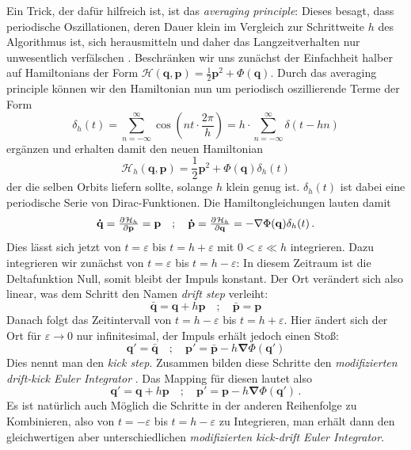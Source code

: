 \documentclass[12pt,a4paper,twoside,open=right,bibliography=totoc]{scrbook}
\renewcommand{\cite}{ \citep}
\renewcommand{\vec}{\mathbf}
\renewcommand{\H}{\mathcal H}
\begin{document}
Ein Trick, der dafür hilfreich ist, ist das \textit{averaging principle}: Dieses besagt, dass periodische Oszillationen, deren Dauer klein im Vergleich zur Schrittweite $h$ des Algorithmus ist, sich herausmitteln und daher das Langzeitverhalten nur unwesentlich verfälschen\cite{Wisdom1991}.
Beschränken wir uns zunächst der Einfachheit halber auf Hamiltonians der Form $\mathcal H(\vec q,\vec p)= \frac{1}{2}\vec p^2+\Phi(\vec q)$.
Durch das averaging principle können wir den Hamiltonian nun um periodisch oszillierende Terme der Form
\begin{equation}
\delta_h(t) = \sum\limits_{n=-\infty}^{\infty} \cos(nt\cdot \frac{2\pi}{h}) = h \cdot \sum\limits_{n=-\infty}^{\infty} \delta(t-h n)
\end{equation}
ergänzen und erhalten damit den neuen Hamiltonian
\begin{equation}
\mathcal H_h(\vec q,\vec p)= \frac{1}{2}\vec p^2+\Phi(\vec q)\delta_h(t)
\end{equation}
der die selben Orbits liefern sollte, solange $h$ klein genug ist. $\delta_h(t)$ ist dabei eine periodische Serie von Dirac-Funktionen. Die Hamiltongleichungen lauten damit
\begin{equation}
\vec{\dot q} = \pd{\H_h}{\vec{p}} = \vec{p} \quad ; \quad 
\vec{\dot p} = \pd{\H_h}{\vec{q}} = - \vec{\nabla}\Phi(\vec q)\delta_h(t) \, .
\end{equation}
Dies lässt sich jetzt von $t=\varepsilon$ bis $t=h+\varepsilon$ mit $0 < \varepsilon \ll h$ integrieren. Dazu integrieren wir zunächst von $t=\varepsilon$ bis $t=h-\varepsilon$: In diesem Zeitraum ist die Deltafunktion Null, somit bleibt der Impuls konstant. Der Ort verändert sich also linear, was dem Schritt den Namen \textit{drift step} verleiht:
\begin{equation}
\bar{\vec{q}} = \vec{q}+h\vec{p} \quad ; \quad \bar{\vec{p}} = \vec{p}
\end{equation}
Danach folgt das Zeitintervall von $t=h-\varepsilon$ bis $t=h+\varepsilon$. Hier ändert sich der Ort für $\varepsilon\to 0$ nur infinitesimal, der Impuls erhält jedoch einen Stoß:
\begin{equation}
\vec{q'}=\vec{\bar{q}} \quad ; \quad \vec{p'}=\vec{\bar{p}}-h\vec{\nabla}\Phi(\vec{q'})
\end{equation}
Dies nennt man den \textit{kick step}. Zusammen bilden diese Schritte den \textit{modifizierten drift-kick Euler Integrator}\cite{Binney2008}.
Das Mapping für diesen lautet also
\begin{equation}
\vec{q'}=\vec{q}+h\vec{p} \quad ; \quad \vec{p'}=\vec{p}-h\vec{\nabla}\Phi(\vec{q'})\,.
\end{equation}
Es ist natürlich auch Möglich die Schritte in der anderen Reihenfolge zu Kombinieren, also von $t=-\varepsilon$ bis $t=h-\varepsilon$ zu Integrieren, man erhält dann den gleichwertigen aber unterschiedlichen \textit{modifizierten kick-drift Euler Integrator}.
\end{document}
